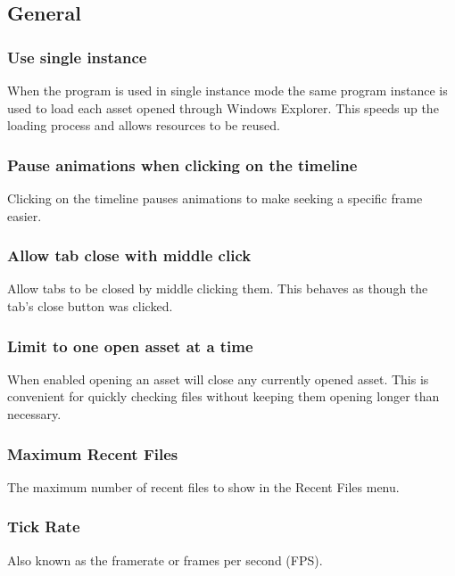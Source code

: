\documentclass[10pt, a4paper, titlepage, oneside]{article}
\begin{document}
\subsection{General}

\subsubsection{Use single instance}

When the program is used in single instance mode the same program instance is used to load each asset opened through Windows Explorer. This speeds up the loading process and allows resources to be reused.

\subsubsection{Pause animations when clicking on the timeline}

Clicking on the timeline pauses animations to make seeking a specific frame easier.

\subsubsection{Allow tab close with middle click}

Allow tabs to be closed by middle clicking them. This behaves as though the tab's close button was clicked.

\subsubsection{Limit to one open asset at a time}

When enabled opening an asset will close any currently opened asset. This is convenient for quickly checking files without keeping them opening longer than necessary.

\subsubsection{Maximum Recent Files}

The maximum number of recent files to show in the Recent Files menu.

\subsubsection{Tick Rate}

Also known as the framerate or frames per second (FPS).
\end{document}
